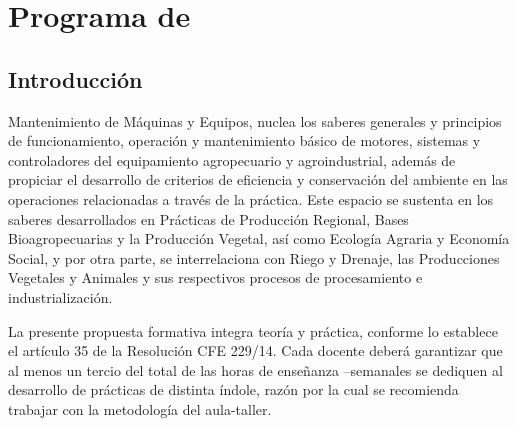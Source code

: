 \chapter*{Programa de \materiaLong}
\section*{Introducción}

Mantenimiento de Máquinas y Equipos, nuclea los saberes generales y
principios de funcionamiento, operación y mantenimiento básico de motores, sistemas
y controladores del equipamiento agropecuario y agroindustrial, además de propiciar el desarrollo de criterios de eficiencia y conservación del ambiente en las operaciones relacionadas a través de la práctica.
Este espacio se sustenta en los saberes desarrollados en Prácticas de
Producción Regional, Bases Bioagropecuarias y la Producción Vegetal, así como
Ecología Agraria y Economía Social, y por otra parte, se interrelaciona con Riego y
Drenaje, las Producciones Vegetales y Animales y sus respectivos procesos de
procesamiento e industrialización.

La presente propuesta formativa integra teoría y práctica, conforme lo
establece el artículo 35 de la Resolución CFE 229/14. Cada docente deberá garantizar
que al menos un tercio del total de las horas de enseñanza –semanales se dediquen al
desarrollo de prácticas de distinta índole, razón por la cual se recomienda trabajar con
la metodología del aula-taller. 


